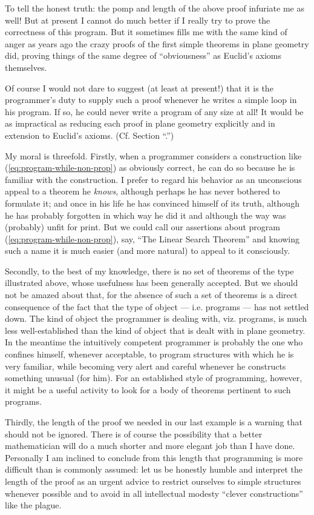 To tell the honest truth: the pomp and length of the above proof infuriate me as well! But at present I cannot do much better if I really try to prove the correctness of this program. But it sometimes fills me with the same kind of anger as years ago the crazy proofs of the first simple theorems in plane geometry did, proving things of the same degree of ``obviousness'' as Euclid's axioms themselves.

Of course I would not dare to suggest (at least at present!) that it is the programmer's duty to supply such a proof whenever he writes a simple loop in his program. If so, he could never write a program of any size at all! It would be as impractical as reducing each proof in plane geometry explicitly and in extension to Euclid's axioms. (Cf. Section ``.'')

My moral is threefold. Firstly, when a programmer considers a construction like (\ref{eq:program-while-non-prop}) as obviously correct, he can do so because he is familiar with the construction. I prefer to regard his behavior as an unconscious appeal to a theorem he \textit{knows}, although perhaps he has never bothered to formulate it; and once in his life he has convinced himself of its truth, although he has probably forgotten in which way he did it and although the way was (probably) unfit for print. But we could call our assertions about program (\ref{eq:program-while-non-prop}), say, ``The Linear Search Theorem'' and knowing such a name it is much easier (and more natural) to appeal to it consciously.

Secondly, to the best of my knowledge, there is no set of theorems of the type illustrated above, whose usefulness has been generally accepted. But we should not be amazed about that, for the absence of such a set of theorems is a direct consequence of the fact that the type of object --- i.e. programs --- has not settled down. The kind of object the programmer is dealing with, viz. programs, is much less well-established than the kind of object that is dealt with in plane geometry. In the meantime the intuitively competent programmer is probably the one who confines himself, whenever acceptable, to program structures with which he is very familiar, while becoming very alert and careful whenever he constructs something unusual (for him). For an established style of programming, however, it might be a useful activity to look for a body of theorems pertinent to such programs.

Thirdly, the length of the proof we needed in our last example is a warning that should not be ignored. There is of course the possibility that a better mathematician will do a much shorter and more elegant job than I have done. Personally I am inclined to conclude from this length that programming is more difficult than is commonly assumed: let us be honestly humble and interpret the length of the proof as an urgent advice to restrict ourselves to simple structures whenever possible and to avoid in all intellectual modesty ``clever constructions'' like the plague.

